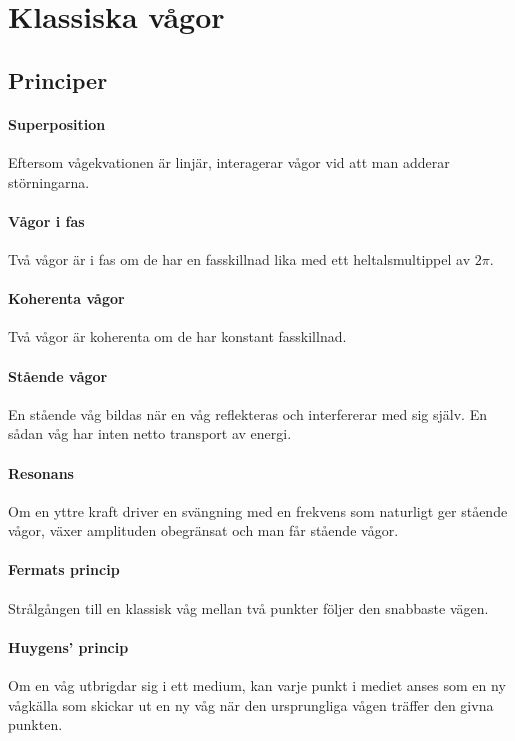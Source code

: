 \section{Klassiska vågor}

\subsection{Principer}

\paragraph{Superposition}
Eftersom vågekvationen är linjär, interagerar vågor vid att man adderar störningarna.

\paragraph{Vågor i fas}
Två vågor är i fas om de har en fasskillnad lika med ett heltalsmultippel av $2\pi$.

\paragraph{Koherenta vågor}
Två vågor är koherenta om de har konstant fasskillnad.

\paragraph{Stående vågor}
En stående våg bildas när en våg reflekteras och interfererar med sig själv. En sådan våg har inten netto transport av energi.

\paragraph{Resonans}
Om en yttre kraft driver en svängning med en frekvens som naturligt ger stående vågor, växer amplituden obegränsat och man får stående vågor.

\paragraph{Fermats princip}
Strålgången till en klassisk våg mellan två punkter följer den snabbaste vägen.

\paragraph{Huygens' princip}
Om en våg utbrigdar sig i ett medium, kan varje punkt i mediet anses som en ny vågkälla som skickar ut en ny våg när den ursprungliga vågen träffer den givna punkten.

